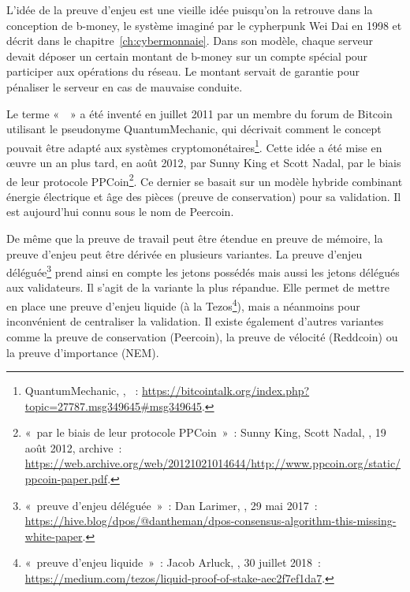 
L'idée de la preuve d'enjeu est une vieille idée puisqu'on la retrouve dans la conception de b-money, le système imaginé par le cypherpunk Wei Dai en 1998 et décrit dans le chapitre~\ref{ch:cybermonnaie}. Dans son modèle, chaque serveur devait déposer un certain montant de b-money sur un compte spécial pour participer aux opérations du réseau. Le montant servait de garantie pour pénaliser le serveur en cas de mauvaise conduite.

Le terme «~~» a été inventé en juillet 2011 par un membre du forum de Bitcoin utilisant le pseudonyme QuantumMechanic, qui décrivait comment le concept pouvait être adapté aux systèmes cryptomonétaires\footnote{QuantumMechanic, , ~: \url{https://bitcointalk.org/index.php?topic=27787.msg349645\#msg349645}.}. Cette idée a été mise en œuvre un an plus tard, en août 2012, par Sunny King et Scott Nadal, par le biais de leur protocole PPCoin\footnote{«~par le biais de leur protocole PPCoin~»~: Sunny King, Scott Nadal, , 19 août 2012, archive~: \url{https://web.archive.org/web/20121021014644/http://www.ppcoin.org/static/ppcoin-paper.pdf}.}. Ce dernier se basait sur un modèle hybride combinant énergie électrique et âge des pièces (preuve de conservation) pour sa validation. Il est aujourd'hui connu sous le nom de Peercoin.

De même que la preuve de travail peut être étendue en preuve de mémoire, la preuve d'enjeu peut être dérivée en plusieurs variantes. La preuve d'enjeu déléguée\footnote{«~preuve d'enjeu déléguée~»~: Dan Larimer, , 29 mai 2017~: \url{https://hive.blog/dpos/@dantheman/dpos-consensus-algorithm-this-missing-white-paper}.} prend ainsi en compte les jetons possédés mais aussi les jetons délégués aux validateurs. Il s'agit de la variante la plus répandue. Elle permet de mettre en place une preuve d'enjeu liquide (à la Tezos\footnote{«~preuve d'enjeu liquide~»~: Jacob Arluck, , 30 juillet 2018~: \url{https://medium.com/tezos/liquid-proof-of-stake-aec2f7ef1da7}.}), mais a néanmoins pour inconvénient de centraliser la validation. Il existe également d'autres variantes comme la preuve de conservation (Peercoin), la preuve de vélocité (Reddcoin) ou la preuve d'importance (NEM).

